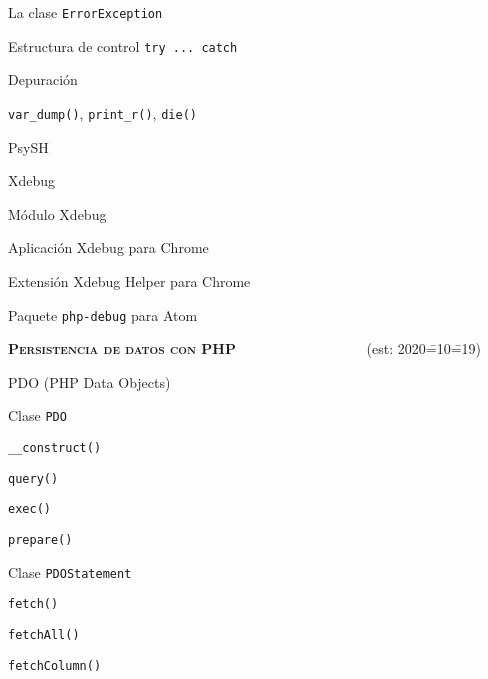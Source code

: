 \begin{longenum}
\begin{longenum}
\begin{longenum}
            \item La clase \texttt{ErrorException}
            \item Estructura de control \texttt{try ... catch}
        \end{longenum}
        \item Depuración 
        \begin{longenum}
            \item \texttt{var\_dump()}, \texttt{print\_r()}, \texttt{die()}
            \item PsySH
            \item Xdebug \opcional\
            \begin{longenum}
                \item Módulo Xdebug
                \item Aplicación Xdebug para Chrome
                \item Extensión Xdebug Helper para Chrome
                \item Paquete \texttt{php-debug} para Atom
            \end{longenum}
        \end{longenum}
    \end{longenum}
    \item \textbf{\textsc{Persistencia de datos con PHP}} \ \ \ \ \ \ \ \ \ \ \ \ \ \ \ \ \ \ (est: 2020\==10\==19)
    \begin{longenum}
        \item PDO (PHP Data Objects)
        \begin{longenum}
            \item Clase \texttt{PDO}
            \begin{longenum}
                \item \texttt{\_\_construct()}
                \item \texttt{query()}
                \item \texttt{exec()}
                \item \texttt{prepare()}
            \end{longenum}
            \item Clase \texttt{PDOStatement}
            \begin{longenum}
                \item \texttt{fetch()}
                \item \texttt{fetchAll()}
                \item \texttt{fetchColumn()}

\end{longenum}
\end{longenum}
\end{longenum}
\end{longenum}
